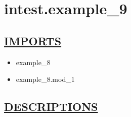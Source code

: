 \chapter*{intest.example\_9}
\hypertarget{ecldoc:toc:intest.example_9}{}

\section*{\underline{IMPORTS}}
\begin{itemize}
\item example\_8
\item example\_8.mod\_1
\end{itemize}

\section*{\underline{DESCRIPTIONS}}
